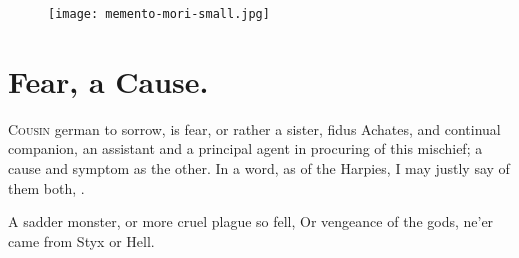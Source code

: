 {{\cleartoleftpage{}
\begin{figure}[p]
  \begingroup
  \centering
  \texttt{[image: memento-mori-small.jpg]}
  \label{fig:mementomori}
\end{figure}

\clearpage{}
\thispagestyle{titleontop}
\section{Fear, a Cause.}

\lettrine{C}{ousin} german to sorrow, is fear, or rather a sister, fidus Achates,
and continual companion, an assistant and a principal agent in
procuring of this mischief; a cause and symptom as the other. In a
word, as \Virgil{} of the Harpies, I may justly say of them both,
.

A sadder monster, or more cruel plague so fell,
Or vengeance of the gods, ne'er came from Styx or Hell.

}}
